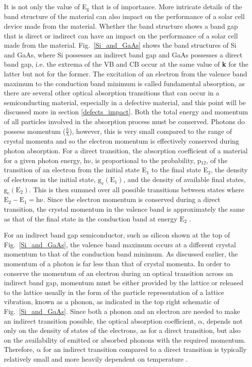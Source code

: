 \documentclass[11pt, twoside]{report}
\begin{document}
It is not only the value of E$_\mathrm{g}$ that is of importance. More intricate details of the band structure of the material can also impact on the performance of a solar cell device made from the material. Whether the band structure shows a band gap that is direct or indirect can have an impact on the performance of a solar cell made from the material. Fig.~\ref{Si_and_GaAs} shows the band structures of Si and GaAs, where Si possesses an indirect band gap and GaAs possesses a direct band gap, i.e. the extrema of the VB and CB occur at the same value of \textbf{k} for the latter but not for the former. The excitation of an electron from the valence band maximum to the conduction band minimum is called fundamental absorption, as there are several other optical absorption transitions that can occur in a semiconducting material, especially in a defective material, and this point will be discussed more in section \ref{defects_impact}. Both the total energy and momentum of all particles involved in the absorption process must be conserved. Photons do possess momentum ($\frac{h}{\lambda}$), however, this is very small compared to the range of crystal momenta and so the electron momentum is effectively conserved during photon absorption. For a direct transition, the absorption coefficient of a material for a given photon energy, $\mathrm{h \nu}$, is proportional to the probability, p$_{12}$, of the transition of an electron from the initial state E$_1$ to the final state E$_2$, the density of electrons in the initial state, $\mathrm{g_{v}(E_1)}$, and the density of available final states, $\mathrm{g_{c}(E_2)}$. This is then summed over all possible transitions between states where $\mathrm{E_2 - E_1 = h\nu}$. Since the electron momentum is conserved during a direct transition, the crystal momentum in the valence band is approximately the same as that of the final state in the conduction band at energy $\mathrm{E_2}$ \cite{PV_bands_book}.

For an indirect band gap semiconductor, such as silicon shown at the top of Fig.~\ref{Si_and_GaAs}, the valence band maximum occurs at a different crystal momentum to that of the conduction band minimum. As discussed earlier, the momentum of a photon is far less than that of crystal momenta. In order to conserve the momentum of an electron during an optical transition across an indirect band gap, momentum must be either provided by the lattice or released to the lattice usually in the form of the particle representation of a lattice vibration, known as a phonon, as indicated in the top right schematic of Fig.~\ref{Si_and_GaAs}. Since both a phonon and an electron are needed to make an indirect transition possible, the optical absorption coefficient, $\mathrm{\alpha}$, depends not only on the density of states of the electrons, as for a direct transition, but also on the availability of emitted or absorbed phonons with the required momentum. Therefore, $\mathrm{\alpha}$ for an indirect transition compared to a direct transition is typically relatively small and more heavily dependent on temperature \cite{Nelson3}. 
\end{document}

